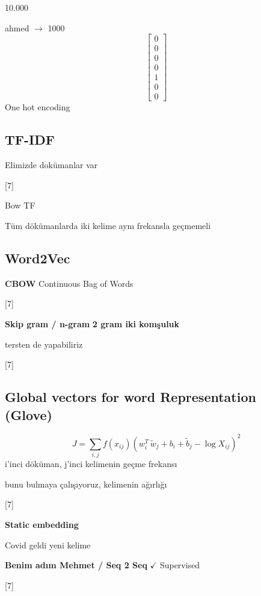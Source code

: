 \documentclass[11pt,a4paper]{article}
\begin{document}
10.000

ahmed $\to$ 1000
\[ \begin{bmatrix}0\\0\\0\\0\\1\\0\\0\end{bmatrix} \]
One hot encoding

\subsection{TF-IDF}

Elimizde dokümanlar var

[7]

Bow TF

Tüm dökümanlarda iki kelime aynı frekansla geçmemeli

\subsection{Word2Vec}

\textbf{CBOW} \quad Continuous Bag of Words

[7]

\textbf{Skip gram / n-gram} \quad \textbf{2 gram iki komşuluk}

tersten de yapabiliriz

[7]

\subsection{Global vectors for word Representation (Glove)}
\[ J=\sum_{i,j} f(x_{ij})\left(w_i^{T}\,\tilde{w}_j+b_i+\tilde{b}_j-\log X_{ij}\right)^{2} \]
i'inci döküman, j'inci kelimenin geçme frekansı

bunu bulmaya çalışıyoruz, kelimenin ağırlığı

[7]

\textbf{Static embedding}

Covid geldi yeni kelime

\textbf{Benim adım Mehmet / Seq 2 Seq} \quad $\checkmark$ Supervised

[7]
\end{document}
